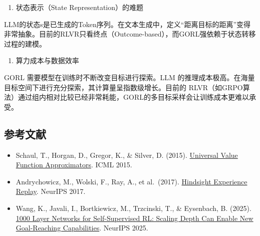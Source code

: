 \begin{enumerate}
\def\labelenumi{\arabic{enumi}.}
\setcounter{enumi}{1}
\tightlist
\item
  状态表示（State Representation）的难题
\end{enumerate}

LLM的状态s是已生成的Token序列。在文本生成中，定义``距离目标的距离''变得非常抽象。目前的RLVR只看终点（Outcome-based），而GORL强依赖于状态转移过程的建模。

\begin{enumerate}
\def\labelenumi{\arabic{enumi}.}
\setcounter{enumi}{2}
\tightlist
\item
  算力成本与数据效率
\end{enumerate}

GORL 需要模型在训练时不断改变目标进行探索。LLM 的推理成本极高。在海量目标空间下进行充分探索，其计算量呈指数级增长。目前的 RLVR（如GRPO算法）通过组内相对比较已经非常耗能，GORL的多目标采样会让训练成本更难以承受。

\FloatBarrier
{}
\hypertarget{ux53c2ux8003ux6587ux732e-66}{%
\subsection{参考文献}\label{ux53c2ux8003ux6587ux732e-66}}

\vspace{0.25em}
\begin{itemize}
\tightlist
\item
  Schaul, T., Horgan, D., Gregor, K., \& Silver, D. (2015). \href{https://proceedings.mlr.press/v37/schaul15.html}{Universal Value Function Approximators}. ICML 2015.
\item
  Andrychowicz, M., Wolski, F., Ray, A., et al.~(2017). \href{https://arxiv.org/abs/1707.01495}{Hindsight Experience Replay}. NeurIPS 2017.
\item
  Wang, K., Javali, I., Bortkiewicz, M., Trzcinski, T., \& Eysenbach, B. (2025). \href{https://proceedings.neurips.cc/paper_files/paper/2025/hash/e74ee34cc0f2d0780f34ee77d8fba25b-Abstract-Conference.html}{1000 Layer Networks for Self-Supervised RL: Scaling Depth Can Enable New Goal-Reaching Capabilities}. NeurIPS 2025.
\end{itemize}

\clearpage
